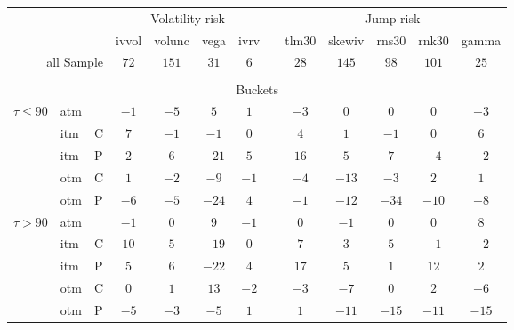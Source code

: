 \begin{tabular}{@{}lllcccccccccc@{}}%
\toprule%
&&&\multicolumn{4}{c}{Volatility risk}&&\multicolumn{5}{c}{Jump risk}\\%
&&&ivvol&volunc&vega&ivrv&&tlm30&skewiv&rns30&rnk30&gamma\\%
\midrule%
\multicolumn{3}{r}{all Sample}&$72$&$151$&$31$&$6$&&$28$&$145$&$98$&$101$&$25$\\%
&&&&&&&&&&&&\\%
\multicolumn{13}{c}{Buckets}\\%
\midrule%
\multirow{5}{*}{$\tau \leq 90$}&atm&&$-1$&$-5$&$5$&$1$&&$-3$&$0$&$0$&$0$&$-3$\\%
&itm&C&$7$&$-1$&$-1$&$0$&&$4$&$1$&$-1$&$0$&$6$\\%
&itm&P&$2$&$6$&$-21$&$5$&&$16$&$5$&$7$&$-4$&$-2$\\%
&otm&C&$1$&$-2$&$-9$&$-1$&&$-4$&$-13$&$-3$&$2$&$1$\\%
&otm&P&$-6$&$-5$&$-24$&$4$&&$-1$&$-12$&$-34$&$-10$&$-8$\\%
\midrule%
\multirow{5}{*}{$\tau > 90$}&atm&&$-1$&$0$&$9$&$-1$&&$0$&$-1$&$0$&$0$&$8$\\%
&itm&C&$10$&$5$&$-19$&$0$&&$7$&$3$&$5$&$-1$&$-2$\\%
&itm&P&$5$&$6$&$-22$&$4$&&$17$&$5$&$1$&$12$&$2$\\%
&otm&C&$0$&$1$&$13$&$-2$&&$-3$&$-7$&$0$&$2$&$-6$\\%
&otm&P&$-5$&$-3$&$-5$&$1$&&$1$&$-11$&$-15$&$-11$&$-15$\\\bottomrule%
%
\end{tabular}